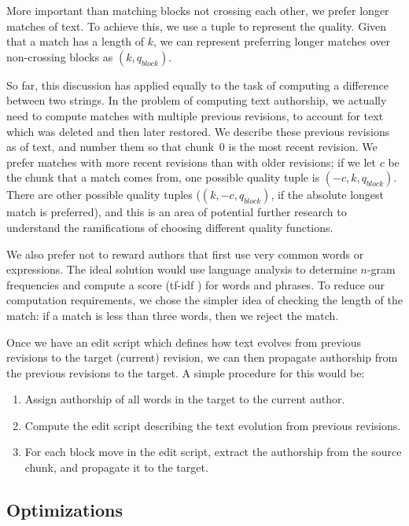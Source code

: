 More important than matching blocks not crossing each other,
we prefer longer matches of text.
To achieve this, we use a tuple to represent the quality.
Given that a match has a length of $k$, we can represent preferring
longer matches over non-crossing blocks as $(k, q_{block})$.

So far, this discussion has applied equally to the task of
computing a difference between two strings.
In the problem of computing text authorship, we actually
need to compute matches with multiple previous revisions,
to account for text which was deleted and then later restored.
We describe these previous revisions as  of text,
and number them so that chunk~0 is the most recent revision.
We prefer matches with more recent revisions than with older
revisions; if we let $c$ be the chunk that a match comes from,
one possible quality tuple is $(-c, k, q_{block})$.
There are other possible quality tuples (\eg $(k, -c, q_{block})$,
if the absolute longest match is preferred), and this is
an area of potential further research to understand the ramifications
of choosing different quality functions.

We also prefer not to reward authors that first use very common words
or expressions.
The ideal solution would use language analysis to determine
$n$-gram frequencies and compute
a score (\eg tf-idf ) for words and phrases.
To reduce our computation requirements, we chose the simpler idea
of checking the length of the match: if a match is less than three
words, then we reject the match.

Once we have an edit script which defines how text evolves from
previous revisions to the target (current) revision, we can then propagate
authorship from the previous revisions to the target.
A simple procedure for this would be:
\begin{enumerate}
\item Assign authorship of all words in the target to the current author.
\item Compute the edit script describing the text evolution from
    previous revisions.
\item For each block move in the edit script, extract the authorship
    from the source chunk, and propagate it to the target.
\end{enumerate}

\subsection{Optimizations}

